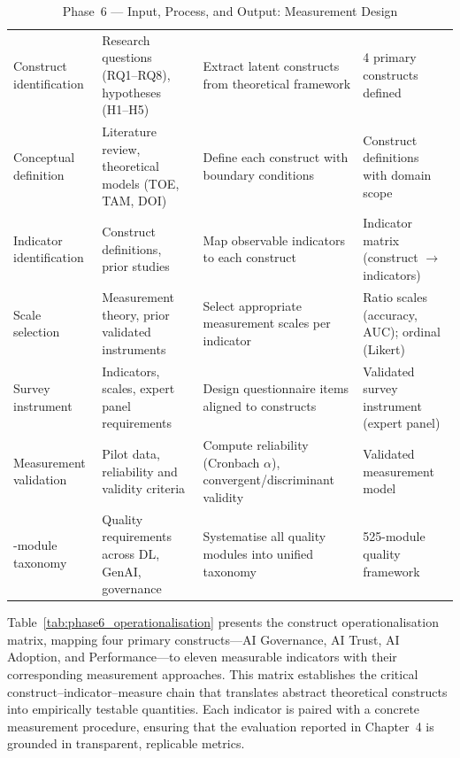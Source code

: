 \begin{xltabular}{\textwidth}{@{} l X X X @{}}
\caption{Phase~6 --- Input, Process, and Output: Measurement Design}
\label{tab:phase6_ipo}\\
\toprule
{} &  &  &  \\
\midrule
\endfirsthead
\endhead
\bottomrule
\endlastfoot
Construct identification   & Research questions (RQ1--RQ8), hypotheses (H1--H5)        & Extract latent constructs from theoretical framework       & 4 primary constructs defined \\
\addlinespace
Conceptual definition      & Literature review, theoretical models (TOE, TAM, DOI)     & Define each construct with boundary conditions              & Construct definitions with domain scope \\
\addlinespace
Indicator identification   & Construct definitions, prior studies                      & Map observable indicators to each construct                 & Indicator matrix (construct $\rightarrow$ indicators) \\
\addlinespace
Scale selection            & Measurement theory, prior validated instruments           & Select appropriate measurement scales per indicator         & Ratio scales (accuracy, AUC); ordinal (Likert) \\
\addlinespace
Survey instrument          & Indicators, scales, expert panel requirements             & Design questionnaire items aligned to constructs            & Validated survey instrument (expert panel) \\
\addlinespace
Measurement validation     & Pilot data, reliability and validity criteria             & Compute reliability (Cronbach $\alpha$), convergent/discriminant validity & Validated measurement model \\
-module taxonomy        & Quality requirements across DL, GenAI, governance      & Systematise all quality modules into unified taxonomy       & 525-module quality framework \\
\end{xltabular}
\endgroup

\vspace{1.5em}

Table~\ref{tab:phase6_operationalisation} presents the construct operationalisation matrix, mapping four primary constructs---AI Governance, AI Trust, AI Adoption, and Performance---to eleven measurable indicators with their corresponding measurement approaches. This matrix establishes the critical construct--indicator--measure chain that translates abstract theoretical constructs into empirically testable quantities. Each indicator is paired with a concrete measurement procedure, ensuring that the evaluation reported in Chapter~4 is grounded in transparent, replicable metrics.

